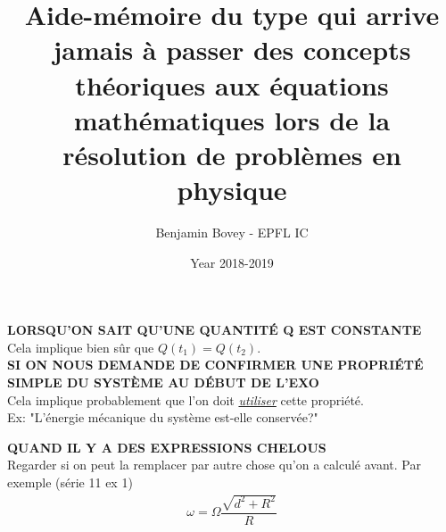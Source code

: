\documentclass{article}
\title{Aide-mémoire du type qui arrive jamais à passer des concepts théoriques aux équations mathématiques lors de la résolution de problèmes en physique}
\author{Benjamin Bovey - EPFL IC}
\date{Year 2018-2019}
\begin{document}
\maketitle

\textbf{LORSQU'ON SAIT QU'UNE QUANTITÉ Q EST CONSTANTE} \\
Cela implique bien sûr que \(\boxed{Q(t_1) = Q(t_2)}\). \\

\textbf{SI ON NOUS DEMANDE DE CONFIRMER UNE PROPRIÉTÉ SIMPLE DU SYSTÈME AU DÉBUT DE L'EXO} \\
Cela implique probablement que l'on doit \underline{\emph{utiliser}} cette propriété. \\
Ex: "L'énergie mécanique du système est-elle conservée?" 

\textbf{QUAND IL Y A DES EXPRESSIONS CHELOUS} \\
Regarder si on peut la remplacer par autre chose qu'on a calculé avant. Par exemple (série 11 ex 1)
\begin{align*}
	\omega = \Omega \dfrac{\sqrt{d^2 + R^2}}{R} \\
\end{align*}
\end{document}
